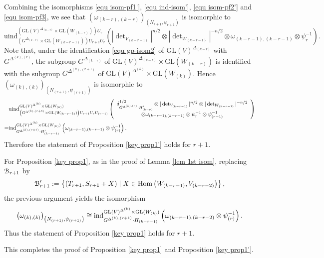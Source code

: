 \documentclass[11pt,reqno]{amsart}
\renewcommand{\1}{{\mathbf{1}}} \newcommand{\sB}{{\mathscr{B}}}
\newcommand{\GL}{{\mathrm{GL}}}\newcommand{\G}{{\mathrm{G}}}
\newcommand{\uind}{{\mathrm{uind}}} \newcommand{\uInd}{{\mathrm{uInd}}}
\theoremstyle{plain}
\theoremstyle{definition}
\numberwithin{equation}{section}
\begin{document}
Combining the isomorphisms \eqref{equ isom-pf1'}, \eqref{equ ind-isom'}, \eqref{equ isom-pf2'} and \eqref{equ isom-pf3}, we see that $\left(\omega_{(k-r),(k-r)}\right)_{\left(N_{r+1},\psi_{r+1}\right)}$ is isomorphic to
$$\mathrm{uind}_{\left(G^{\Delta_{(k-r)}}\times\GL(W_{(k-r-1)})\right)U_{r+1}U_r}^{\left(\GL(V)^{\Delta_{(k-r)}}\times\GL(W_{(k-r)})\right)U_r}\left(|\det\nolimits_{V_{(k-r-1)}}|^{n/2}\otimes|\det\nolimits_{W_{(k-r-1)}}|^{-n/2}\otimes\omega_{(k-r-1),(k-r-1)}\otimes\psi_r^{-1}\right).$$
Note that, under the identification \eqref{equ gp-isom2} of  
$\GL(V)^{\Delta_{(k-r)}}$ with $G^{\Delta^{(k),(r)}}$, the subgroup $G^{\Delta_{(k-r)}}$ of $\GL(V)^{\Delta_{(k-r)}}\times\GL(W_{(k-r)})$ is identified with the subgroup $G^{\Delta^{(k),(r+1)}}$ of $\GL(V)^{\Delta^{(k)}}\times\GL(W_{(k)})$.
Hence $\left(\omega_{(k),(k)}\right)_{\left(N_{(r+1)},\psi_{(r+1)}\right)}$ is isomorphic to
$$\begin{aligned}
&\uind_{\left(G^{\Delta^{(k),(r+1)}}\times\GL(W_{(k-r-1)})\right)U_{r+1}U_rU_{(r-1)}}^{
\GL(V)^{\Delta^{(k)}}\times\GL(W_{(k)})}\left(\begin{array}{c}\delta_{G^{\Delta^{(k),(r)}}\cdot H'_{(k-r)}}^{1/2}\otimes|\det\nolimits_{V_{(k-r-1)}}|^{n/2}\otimes|\det\nolimits_{W_{(k-r-1)}}|^{-n/2}\\ \otimes\omega_{(k-r-1),(k-r-1)}\otimes\psi_{r}^{-1}\otimes\psi_{(r-1)}^{-1}\end{array}\right)\\
=&\ind_{G^{\Delta^{(k),(r+1)}}\cdot H'_{(k-r-1)}}^{
\GL(V)^{\Delta^{(k)}}\times\GL(W_{(k)})}\left(\omega_{(k-r-1),(k-r-1)}\otimes\psi_{(r)}^{-1}\right).
\end{aligned}$$
Therefore 
the statement of Proposition \ref{key prop1'}  holds for $r+1$.

For Proposition \ref{key prop1}, as in the proof of Lemma \ref{lem 1st isom}, replacing ${\mathcal {B}}_{r+1}$ by $${\mathcal {B}}'_{r+1}:=\left\{(T_{r+1},S_{r+1}+X)\mid X\in {\mathrm{Hom}}\left(W_{(k-r-1)},V_{(k-r-2)}\right)\right\},$$ the previous argument yields the isomorphism
$$\left(\omega_{(k),(k)}\right)_{\left(N_{(r+1)},\psi_{(r+1)}\right)}\cong\ind_{G^{\Delta^{(k),(r+1)}}\cdot H_{(k-r-1)}}^{
\GL(V)^{\Delta^{(k)}}\times\GL(W_{(k)})}\left(\omega_{(k-r-1),(k-r-2)}\otimes\psi_{(r)}^{-1}\right).$$
Thus 
the statement of Proposition \ref{key prop1}  holds for $r+1$.

This completes the proof of Proposition \ref{key prop1}  and Proposition \ref{key prop1'}.
\end{document}

